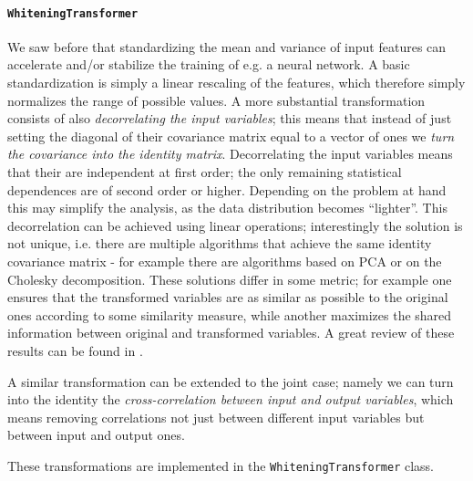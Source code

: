 \paragraph{\texttt{WhiteningTransformer}}
We saw before that standardizing the mean and variance of input features can accelerate and/or stabilize the training of e.g. a neural network. A basic standardization is simply a linear rescaling of the features, which therefore simply normalizes the range of possible values. A more substantial transformation consists of also \emph{decorrelating the input variables}; this means that instead of just setting the diagonal of their covariance matrix equal to a vector of ones we \emph{turn the covariance into the identity matrix}. Decorrelating the input variables means that their are independent at first order; the only remaining statistical dependences are of second order or higher. Depending on the problem at hand this may simplify the analysis, as the data distribution becomes ``lighter''. This decorrelation can be achieved using linear operations; interestingly the solution is not unique, i.e. there are multiple algorithms that achieve the same identity covariance matrix - for example there are algorithms based on PCA or on the Cholesky decomposition. These solutions differ in some metric; for example one ensures that the transformed variables are as similar as possible to the original ones according to some similarity measure, while another maximizes the shared information between original and transformed variables. A great review of these results can be found in \cite{whitening}.

A similar transformation can be extended to the joint case; namely we can turn into the identity the \emph{cross-correlation between input and output variables}, which means removing correlations not just between different input variables but between input and output ones.

These transformations are implemented in the \texttt{WhiteningTransformer} class.



